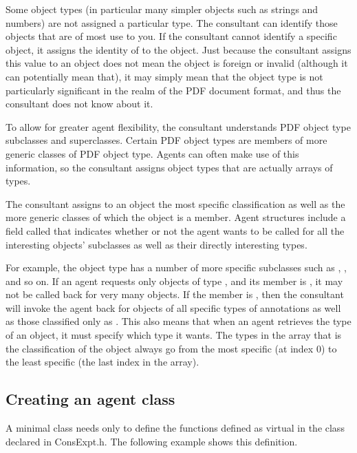 \documentclass[letterpaper,12pt,english,openany,oneside]{sphinxmanual}
\begin{document}
Some object types (in particular many simpler objects such as strings and numbers) are not assigned a particular type. The consultant can identify those objects that are of most use to you. If the consultant cannot identify a specific object, it assigns the identity of  to the object. Just because the consultant assigns this value to an object does not mean the object is foreign or invalid (although it can potentially mean that), it may simply mean that the object type is not particularly significant in the realm of the PDF document format, and thus the consultant does not know about it.

To allow for greater agent flexibility, the consultant understands PDF object type subclasses and superclasses. Certain PDF object types are members of more generic classes of PDF object type. Agents can often make use of this information, so the consultant assigns object types that are actually arrays of types.

The consultant assigns to an object the most specific classification as well as the more generic classes of which the object is a member. Agent structures include a field called  that indicates whether or not the agent wants to be called for all the interesting objects’ subclasses as well as their directly interesting types.

For example, the  object type has a number of more specific subclasses such as , , and so on. If an agent requests only objects of type , and its  member is , it may not be called back for very many objects. If the  member is , then the consultant will invoke the agent back for objects of all specific types of annotations as well as those classified only as . This also means that when an agent retrieves the type of an object, it must specify which type it wants. The types in the array that is the classification of the object always go from the most specific (at index 0) to the least specific (the last index in the array).


\subsection{Creating an agent class}
\label{\detokenize{Plugins_ExtendedAPI:creating-an-agent-class}}
A minimal  class needs only to define the functions defined as virtual in the  class declared in ConsExpt.h. The following example shows this definition.
\end{document}
